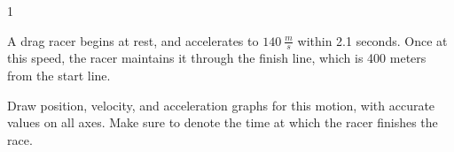 
\AddToShipoutPicture*{\BackgroundPic}

\addtocounter {ProbNum} {1}

 
{\bf \Large{}} A drag racer begins at rest, and accelerates to ${140~\tfrac{m}{s}}$ within 2.1 seconds.  Once at this speed, the racer maintains it through the finish line, which is 400 meters from the start line. \bigskip

Draw position, velocity, and acceleration graphs for this motion, with accurate values on all axes.  Make sure to denote the time at which the racer finishes the race.
\vfill




\newpage